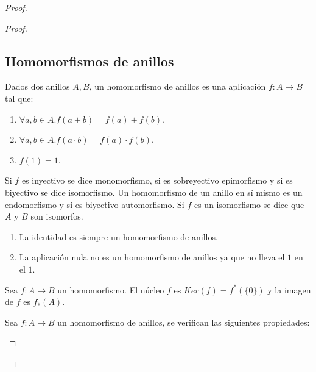\begin{proof}
\begin{proof}
\subsection{Homomorfismos de anillos}

\begin{definition}
	Dados dos anillos $A,B$, un homomorfismo de anillos es una aplicación $f:A \to B$ tal que:
	
	\begin{enumerate}
		\item $\forall a,b \in A. f(a+b) = f(a) + f(b)$.
		\item $\forall a,b \in A. f(a \cdot b) = f(a) \cdot f(b)$.
		\item $f(1) = 1$.
	\end{enumerate}

	Si $f$ es inyectivo se dice monomorfismo, si es sobreyectivo epimorfismo y si es biyectivo se dice isomorfismo. Un homomorfismo de un anillo en sí mismo es un endomorfismo y si es biyectivo automorfismo. Si $f$ es un isomorfismo se dice que $A$ y $B$ son isomorfos. 
\end{definition}

\begin{example}
	\begin{enumerate}
		\item La identidad es siempre un homomorfismo de anillos.
		\item La aplicación nula no es un homomorfismo de anillos ya que no lleva el $1$ en el $1$. 
	\end{enumerate}
\end{example}

\begin{definition}
Sea $f:A \to B$ un homomorfismo. El núcleo $f$ es $Ker(f) = f^*(\{0\})$ y la imagen de $f$ es $f_*(A)$. 
\end{definition}

\begin{proposition}
	Sea $f: A \to B$ un homomorfismo de anillos, se verifican las siguientes propiedades:
	

\end{proposition}
\end{proof}
\end{proof}
